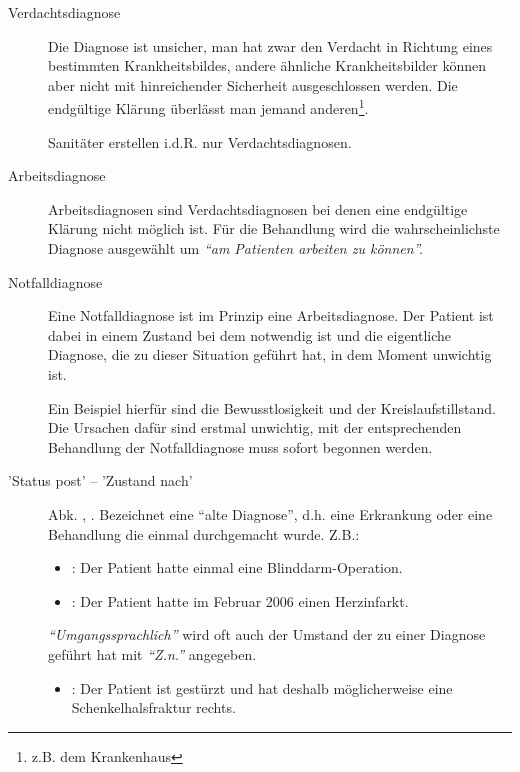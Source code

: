 \begin{description}
    \item[Verdachtsdiagnose]  Die
    Diagnose ist unsicher, man hat zwar den Verdacht in Richtung  eines
    bestimmten Krankheitsbildes, andere ähnliche Krankheitsbilder können  aber
    nicht mit hinreichender Sicherheit ausgeschlossen werden. Die endgültige 
    Klärung überlässt man jemand anderen\footnote{z.B. dem Krankenhaus}. \par 
    Sanitäter erstellen i.d.R. nur Verdachtsdiagnosen.
     
    \item[Arbeitsdiagnose] 
    Arbeitsdiagnosen sind Verdachtsdiagnosen bei denen eine endgültige Klärung
    nicht  möglich ist. Für die Behandlung wird die wahrscheinlichste Diagnose 
    ausgewählt um \emph{``am Patienten arbeiten zu können''.}
    \item[Notfalldiagnose]  Eine
    Notfalldiagnose ist im Prinzip eine Arbeitsdiagnose. Der Patient ist dabei 
    in einem Zustand bei dem  notwendig ist und die 
    eigentliche Diagnose, die zu dieser Situation geführt hat, in dem Moment 
    unwichtig ist. \par Ein Beispiel hierfür sind die Bewusstlosigkeit und der
    Kreislaufstillstand. Die Ursachen dafür sind erstmal unwichtig, mit der
    entsprechenden Behandlung der Notfalldiagnose muss sofort begonnen werden.
    \item['Status post' -- 'Zustand nach']
     Abk. , .  Bezeichnet
    eine ``alte Diagnose'', d.h. eine Erkrankung oder eine Behandlung die einmal durchgemacht wurde. Z.B.:
    \begin{itemize}
        \item {}: Der Patient
        hatte einmal eine Blinddarm-Operation.
        \item {}: Der Patient
        hatte im Februar 2006 einen Herzinfarkt.
    \end{itemize}
    \emph{``Umgangssprachlich''} wird oft auch der Umstand der zu einer
    Diagnose geführt hat mit \emph{``Z.n.''} angegeben. 
    \begin{itemize}
        \item {}: Der
        Patient ist gestürzt und hat deshalb möglicherweise eine
        Schenkelhalsfraktur rechts.
    \end{itemize}
\end{description}
